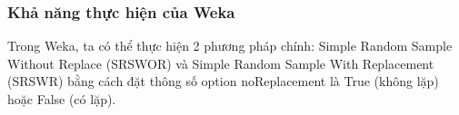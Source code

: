 \subsubsection{Khả năng thực hiện của Weka}
Trong Weka, ta có thể thực hiện 2 phương pháp chính: Simple Random Sample Without Replace (SRSWOR) và Simple Random Sample With Replacement (SRSWR) bằng cách đặt thông số option noReplacement là True (không lặp) hoặc False (có lặp).

%
